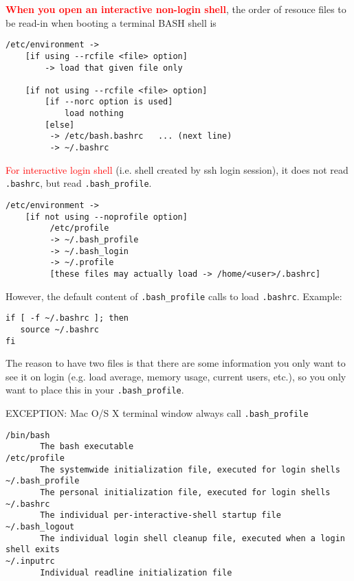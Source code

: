 \label{sec:bash-loading-order-of-files}
\textcolor{red}{\bf When you open an interactive non-login shell}, the order of resouce files to be
read-in when booting a terminal BASH shell is
\begin{verbatim}
/etc/environment -> 
	[if using --rcfile <file> option]
		-> load that given file only
		
	[if not using --rcfile <file> option]
		[if --norc option is used]
			load nothing
		[else]
         -> /etc/bash.bashrc   ... (next line) 
         -> ~/.bashrc
\end{verbatim}

\textcolor{red}{For interactive login shell} (i.e. shell created by ssh login
session), it does not read \verb!.bashrc!, but read \verb!.bash_profile!.
\begin{verbatim}
/etc/environment -> 
	[if not using --noprofile option]
		 /etc/profile 
         -> ~/.bash_profile 
         -> ~/.bash_login 
         -> ~/.profile 
         [these files may actually load -> /home/<user>/.bashrc]

\end{verbatim}
However, the default content of \verb!.bash_profile! calls to load
\verb!.bashrc!. Example:
\begin{verbatim}
if [ -f ~/.bashrc ]; then
   source ~/.bashrc
fi
\end{verbatim}

The reason to have two files is that there are some information 
you only want to see it on login (e.g. load average, memory usage, current
users, etc.), so you only want to place this in your \verb!.bash_profile!.

\begin{mdframed}
EXCEPTION: Mac O/S X terminal window always call \verb!.bash_profile!
\end{mdframed}

\begin{verbatim}
/bin/bash
       The bash executable
/etc/profile
       The systemwide initialization file, executed for login shells
~/.bash_profile
       The personal initialization file, executed for login shells
~/.bashrc
       The individual per-interactive-shell startup file
~/.bash_logout
       The individual login shell cleanup file, executed when a login shell exits
~/.inputrc
       Individual readline initialization file
\end{verbatim}


